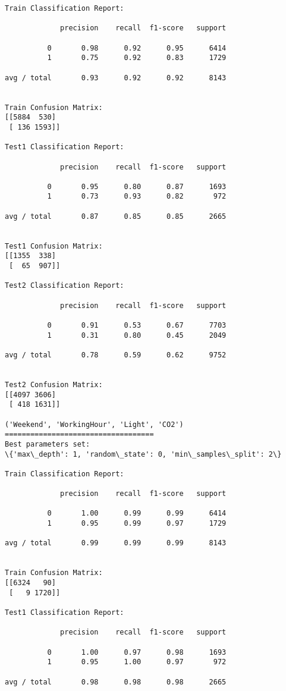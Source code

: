 \documentclass[11pt]{article}
\begin{document}
\begin{Verbatim}[commandchars=\\\{\}]
Train Classification Report:

             precision    recall  f1-score   support

          0       0.98      0.92      0.95      6414
          1       0.75      0.92      0.83      1729

avg / total       0.93      0.92      0.92      8143


Train Confusion Matrix:
[[5884  530]
 [ 136 1593]]

Test1 Classification Report:

             precision    recall  f1-score   support

          0       0.95      0.80      0.87      1693
          1       0.73      0.93      0.82       972

avg / total       0.87      0.85      0.85      2665


Test1 Confusion Matrix:
[[1355  338]
 [  65  907]]

Test2 Classification Report:

             precision    recall  f1-score   support

          0       0.91      0.53      0.67      7703
          1       0.31      0.80      0.45      2049

avg / total       0.78      0.59      0.62      9752


Test2 Confusion Matrix:
[[4097 3606]
 [ 418 1631]]

('Weekend', 'WorkingHour', 'Light', 'CO2')
===================================
Best parameters set:
\{'max\_depth': 1, 'random\_state': 0, 'min\_samples\_split': 2\}

Train Classification Report:

             precision    recall  f1-score   support

          0       1.00      0.99      0.99      6414
          1       0.95      0.99      0.97      1729

avg / total       0.99      0.99      0.99      8143


Train Confusion Matrix:
[[6324   90]
 [   9 1720]]

Test1 Classification Report:

             precision    recall  f1-score   support

          0       1.00      0.97      0.98      1693
          1       0.95      1.00      0.97       972

avg / total       0.98      0.98      0.98      2665



\end{Verbatim}
\end{document}
